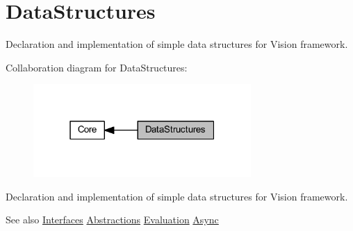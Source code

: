 \hypertarget{group___data_structures}{}\section{Data\+Structures}
\label{group___data_structures}


Declaration and implementation of simple data structures for Vision framework.  


Collaboration diagram for Data\+Structures\+:
\nopagebreak
\begin{figure}[H]
\begin{center}
\leavevmode
\includegraphics[width=235pt]{group___data_structures}
\end{center}
\end{figure}
Declaration and implementation of simple data structures for Vision framework. 

\begin{DoxySeeAlso}{See also}
\hyperlink{group___interfaces}{Interfaces} \hyperlink{group___abstractions}{Abstractions} \hyperlink{group___evaluation}{Evaluation} \hyperlink{group___async}{Async} 
\end{DoxySeeAlso}
